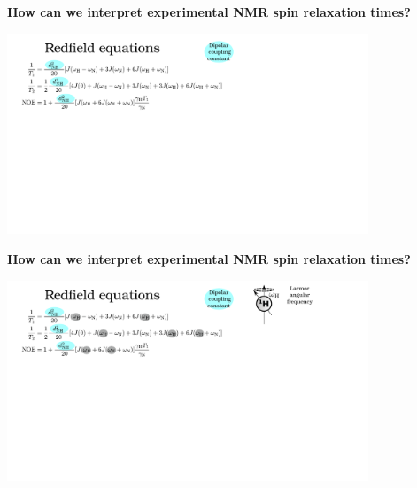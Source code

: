 \documentclass{beamer}
\begin{document}
\addtocounter{framenumber}{-1}
\begin{frame}
\begin{center}
\Large{\centering
\textbf{How can we interpret experimental NMR spin relaxation times?} \\}

\vspace{0.5cm}

\includegraphics[height=6cm]{redfield2.pdf}
\end{center}
\end{frame}

\addtocounter{framenumber}{-1}
\begin{frame}
\begin{center}
\Large{\centering

\textbf{How can we interpret experimental NMR spin relaxation times?} \\}

\vspace{0.5cm}


\includegraphics[height=6cm]{redfield3.pdf}
\end{center}
\end{frame}
\end{document}
